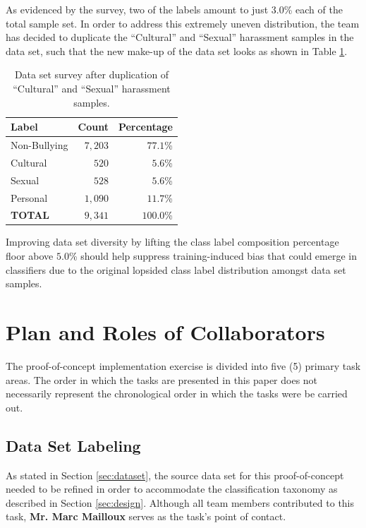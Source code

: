 \documentclass[conference]{sig-alternate-05-2015}
\begin{document}
As evidenced by the survey, two of the labels amount to just $3.0$\% each of the
total sample set. In order to address this extremely uneven distribution, the
team has decided to duplicate the ``Cultural'' and ``Sexual'' harassment samples
in the data set, such that the new make-up of the data set looks as shown in
Table \ref{tab:dataset_survey_final}.

\begin{table}[h!]
  \centering
  \begin{tabular}{| l | r | r |}
    \hline
    Label & Count & Percentage \\
    \hline\hline
    Non-Bullying & $7,203$ & $77.1$\% \\
    \hline
    Cultural & $520$ & $5.6$\% \\
    \hline
    Sexual & $528$ & $5.6$\% \\
    \hline
    Personal & $1,090$ & $11.7$\% \\
    \hline\hline
    \textbf{TOTAL} & $9,341$ & $100.0$\% \\
    \hline
  \end{tabular}
  \caption{Data set survey after duplication of ``Cultural'' and ``Sexual''
  harassment samples.}
  \label{tab:dataset_survey_final}
\end{table}

Improving data set diversity by lifting the class label composition percentage
floor above $5.0$\% should help suppress training-induced bias that could emerge
in classifiers due to the original lopsided class label distribution amongst
data set samples.

\section{Plan and Roles of Collaborators}\label{sec:plan_roles}
The proof-of-concept implementation exercise is divided into five (5)
primary task areas. The order in which the tasks are presented in this paper
does not necessarily represent the chronological order in which the tasks were
be carried out.

\subsection{Data Set Labeling}\label{sec:labeling_task}
As stated in Section \ref{sec:dataset}, the source data set for this
proof-of-concept needed to be refined in order to accommodate the
classification taxonomy as described in Section \ref{sec:design}. Although all
team members contributed to this task, \textbf{Mr. Marc Mailloux} serves as the
task's point of contact.
\end{document}

